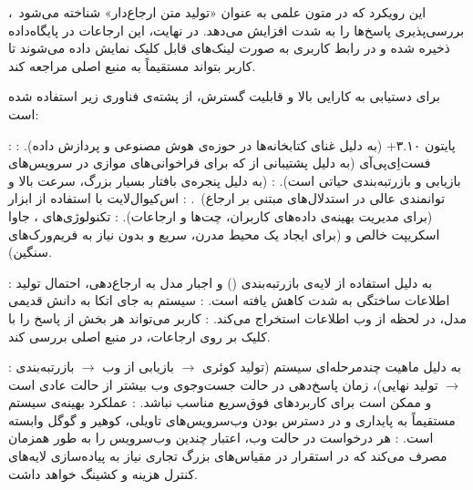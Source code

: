 این رویکرد که در متون علمی به عنوان «تولید متن ارجاع‌دار» شناخته می‌شود~، بررسی‌پذیری پاسخ‌ها را به شدت افزایش می‌دهد. در نهایت، این ارجاعات در پایگاه‌داده ذخیره شده و در رابط کاربری به صورت لینک‌های قابل کلیک نمایش داده می‌شوند تا کاربر بتواند مستقیماً به منبع اصلی مراجعه کند.


برای دستیابی به کارایی بالا و قابلیت گسترش، از پشته‌ی فناوری زیر استفاده شده است:

 : پایتون ۳.۱۰+  (به دلیل غنای کتابخانه‌ها در حوزه‌ی هوش مصنوعی و پردازش داده).
 : فست‌اِی‌پی‌آی (به دلیل پشتیبانی از  که برای فراخوانی‌های موازی در سرویس‌های بازیابی و بازرتبه‌بندی حیاتی است).
 :  (به دلیل پنجره‌ی بافتار بسیار بزرگ، سرعت بالا و توانمندی عالی در استدلال‌های مبتنی بر ارجاع)~.
 : اس‌کیوال‌لایت با استفاده از ابزار  (برای مدیریت بهینه‌ی داده‌های کاربران، چت‌ها و ارجاعات).
 : تکنولوژی‌های ، جاوا اسکریپت خالص و  (برای ایجاد یک محیط مدرن، سریع و بدون نیاز به فریم‌ورک‌های سنگین).




 : به دلیل استفاده از لایه‌ی بازرتبه‌بندی () و اجبار مدل به ارجاع‌دهی، احتمال تولید اطلاعات ساختگی به شدت کاهش یافته است.
 : سیستم به جای اتکا به دانش قدیمی مدل، در لحظه از وب اطلاعات استخراج می‌کند.
 : کاربر می‌تواند هر بخش از پاسخ را با کلیک بر روی ارجاعات، در منبع اصلی بررسی کند.

\vspace{0.5cm} 


 : به دلیل ماهیت چندمرحله‌ای سیستم (تولید کوئری $\rightarrow$ بازیابی از وب $\rightarrow$ بازرتبه‌بندی $\rightarrow$ تولید نهایی)، زمان پاسخ‌دهی در حالت جست‌وجوی وب بیشتر از حالت عادی است و ممکن است برای کاربردهای فوق‌سریع مناسب نباشد.
 : عملکرد بهینه‌ی سیستم مستقیماً به پایداری و در دسترس بودن وب‌سرویس‌های تاویلی، کوهیر و گوگل وابسته است.
 : هر درخواست در حالت وب، اعتبار چندین وب‌سرویس را به طور همزمان مصرف می‌کند که در استقرار در مقیاس‌های بزرگ تجاری نیاز به پیاده‌سازی لایه‌های کنترل هزینه و کشینگ خواهد داشت.
